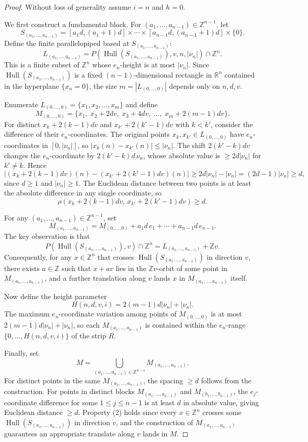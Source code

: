 \documentclass[10pt,a4paper]{amsart}
\DeclareMathOperator{\Hull}{Hull}
\begin{document}
\begin{proof}
Without loss of generality assume $i=n$ and $h=0$.

We first construct a fundamental block. For
$(a_1,\dots, a_{n-1})\in \mathbb{Z}^{n-1}$, let
\[
S_{(a_1,\dots, a_{n-1})}=[a_1d, (a_1+1)d]\times\cdots
\times[a_{n-1}d, (a_{n-1}+1)d]\times\{0\}.
\]
Define the finite parallelopiped based at $S_{(a_1,\dots, a_{n-1})}$:
\[
L_{(a_1,\dots, a_{n-1})}
=P(\Hull(S_{(a_1,\dots, a_{n-1})}), v, n, |\nu_n|)\cap\mathbb{Z}^n.
\]
This is a finite subset of $\mathbb{Z}^n$ whose $e_n$-height is at most
$|\nu_n|$. Since $\Hull(S_{(a_1,\dots, a_{n-1})})$ is a fixed
$(n-1)$-dimensional rectangle in $\mathbb{R}^n$ contained in the hyperplane
$\{x_n=0\}$, the size $m=|L_{(0,\dots,0)}|$ depends only on $n, d, v$.

Enumerate $L_{(0,\dots,0)}=\{x_1, x_2, \dots, x_m\}$ and define
\[
M_{(0,\dots,0)}=\{x_1,\; x_2+2dv,\; x_3+4dv,\; \dots,\;
x_m+2(m-1)dv\}.
\]
For distinct $x_k+2(k-1)dv$ and $x_{k'}+2(k'-1)dv$ with $k<k'$, consider the difference of their $e_n$-coordinates. The original points
$x_k, x_{k'}\in L_{(0,\dots,0)}$ have $e_n$-coordinates in
$[0,|\nu_n|]$, so $|x_k(n)-x_{k'}(n)|\leq |\nu_n|$. The shift
$2(k'-k)dv$ changes the $e_n$-coordinate by $2(k'-k)d\,\nu_n$, whose
absolute value is $\geq 2d|\nu_n|$ for $k'\neq k$. Hence
\[
|(x_k+2(k-1)dv)(n)-(x_{k'}+2(k'-1)dv)(n)|
\geq 2d|\nu_n|-|\nu_n|
= (2d-1)|\nu_n| \geq d,
\]
since $d\geq 1$ and $|\nu_n|\geq 1$. The Euclidean distance between two
points is at least the absolute difference in any single coordinate,
so $$\rho(x_k+2(k-1)dv,\,x_{k'}+2(k'-1)dv)\geq d.$$

For any $(a_1,\dots, a_{n-1})\in \mathbb{Z}^{n-1}$, set
\[
M_{(a_1,\dots, a_{n-1})}=M_{(0,\dots,0)}+a_1d\, e_1
+\cdots+a_{n-1}d\, e_{n-1}.
\]
The key observation is that
\[
P(\Hull(S_{(a_1,\dots, a_{n-1})}), v)\cap\mathbb{Z}^n
= L_{(a_1,\dots, a_{n-1})}+\mathbb{Z}v.
\]
Consequently, for any $x\in\mathbb{Z}^n$ that crosses
$\Hull(S_{(a_1,\dots, a_{n-1})})$ in direction $v$, there exists
$a\in\mathbb{Z}$ such that $x+av$ lies in the $\mathbb{Z}v$-orbit of some
point in $M_{(a_1,\dots, a_{n-1})}$, and a further translation along $v$
lands $x$ in $M_{(a_1,\dots, a_{n-1})}$ itself.

Now define the height parameter
\[
H(n, d, v, i)=2(m-1)d|\nu_n|+|\nu_n|.
\]
The maximum $e_n$-coordinate variation among points of $M_{(0,\dots,0)}$
is at most $2(m-1)d|\nu_n|+|\nu_n|$, so each
$M_{(a_1,\dots, a_{n-1})}$ is contained within the $e_n$-range
$\{0,\dots, H(n,d,v,i)\}$ of the strip $R$.

Finally, set
\[
M=\bigcup_{(a_1,\dots, a_{n-1})\in\mathbb{Z}^{n-1}}
M_{(a_1,\dots, a_{n-1})}.
\]
For distinct points in the same $M_{(a_1,\dots, a_{n-1})}$, the spacing
$\geq d$ follows from the construction. For points in distinct blocks
$M_{(a_1,\dots, a_{n-1})}$ and $M_{(b_1,\dots, b_{n-1})}$, the
$e_j$-coordinate difference for some $1\leq j\leq n-1$ is at least $d$
in absolute value, giving Euclidean distance $\geq d$. Property (2) holds
since every $x\in\mathbb{Z}^n$ crosses some
$\Hull(S_{(a_1,\dots, a_{n-1})})$ in direction $v$, and the construction of
$M_{(a_1,\dots, a_{n-1})}$ guarantees an appropriate translate along $v$
lands in $M$.
\end{proof}
\end{document}
